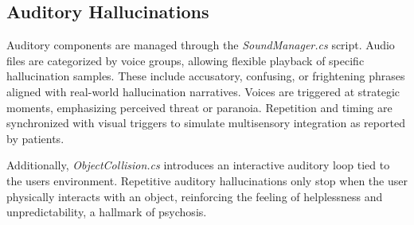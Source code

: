 \begin{landscape}
\begin{center}
{
    }
    \end{center}
    \end{landscape}
    

\subsection{Auditory Hallucinations}
Auditory components are managed through the \textit{SoundManager.cs} script. Audio files are categorized by voice groups, allowing flexible playback of specific hallucination samples. These include accusatory, confusing, or frightening phrases aligned with real-world hallucination narratives. Voices are triggered at strategic moments, emphasizing perceived threat or paranoia. Repetition and timing are synchronized with visual triggers to simulate multisensory integration as reported by patients.

Additionally, \textit{ObjectCollision.cs} introduces an interactive auditory loop tied to the users environment. Repetitive auditory hallucinations only stop when the user physically interacts with an object, reinforcing the feeling of helplessness and unpredictability, a hallmark of psychosis.

